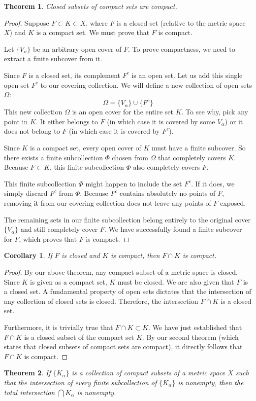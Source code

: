 \documentclass{article}
\theoremstyle{mythm}
\newtheorem{theorem}{Theorem}[section]
\newtheorem{corollary}{Corollary}[theorem]
\begin{document}
\begin{theorem}
Closed subsets of compact sets are compact.
\end{theorem}

\begin{proof}
Suppose $F \subset K \subset X$, where $F$ is a closed set (relative to the metric space $X$) and $K$ is a compact set. We must prove that $F$ is compact.

Let $\{V_\alpha\}$ be an arbitrary open cover of $F$. To prove compactness, we need to extract a finite subcover from it.

Since $F$ is a closed set, its complement $F^c$ is an open set. Let us add this single open set $F^c$ to our covering collection. We will define a new collection of open sets $\Omega$:
\[ \Omega = \{V_\alpha\} \cup \{F^c\} \]
This new collection $\Omega$ is an open cover for the entire set $K$. To see why, pick any point in $K$. It either belongs to $F$ (in which case it is covered by some $V_\alpha$) or it does not belong to $F$ (in which case it is covered by $F^c$).

Since $K$ is a compact set, every open cover of $K$ must have a finite subcover. So there exists a finite subcollection $\Phi$ chosen from $\Omega$ that completely covers $K$. Because $F \subset K$, this finite subcollection $\Phi$ also completely covers $F$.

This finite subcollection $\Phi$ might happen to include the set $F^c$. If it does, we simply discard $F^c$ from $\Phi$. Because $F^c$ contains absolutely no points of $F$, removing it from our covering collection does not leave any points of $F$ exposed. 

The remaining sets in our finite subcollection belong entirely to the original cover $\{V_\alpha\}$ and still completely cover $F$. We have successfully found a finite subcover for $F$, which proves that $F$ is compact.
\end{proof}

\begin{corollary}
If $F$ is closed and $K$ is compact, then $F \cap K$ is compact.
\end{corollary}

\begin{proof}
By our above theorem, any compact subset of a metric space is closed. Since $K$ is given as a compact set, $K$ must be closed. 
We are also given that $F$ is a closed set. A fundamental property of open sets dictates that the intersection of any collection of closed sets is closed. Therefore, the intersection $F \cap K$ is a closed set.

Furthermore, it is trivially true that $F \cap K \subset K$. We have just established that $F \cap K$ is a closed subset of the compact set $K$. 
By our second theorem (which states that closed subsets of compact sets are compact), it directly follows that $F \cap K$ is compact.
\end{proof}
\begin{theorem}
If $\{K_\alpha\}$ is a collection of compact subsets of a metric space $X$ such that the intersection of every finite subcollection of $\{K_\alpha\}$ is nonempty, then the total intersection $\bigcap K_\alpha$ is nonempty.
\end{theorem}
\end{document}
